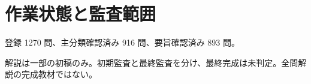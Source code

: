 \chapter{作業状態と監査範囲}
登録 1270 問、主分類確認済み 916 問、要旨確認済み 893 問。
\par 解説は一部の初稿のみ。初期監査と最終監査を分け、最終完成は未判定。全問解説の完成教材ではない。
